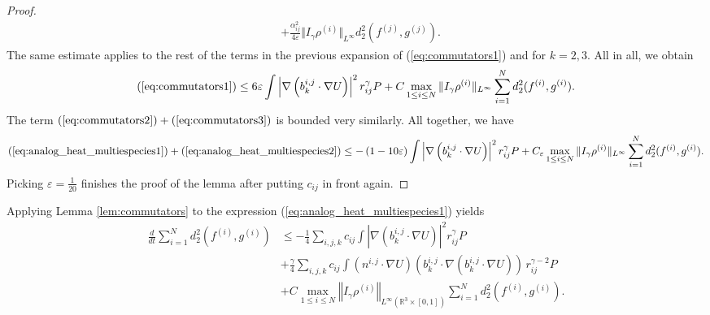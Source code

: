 \documentclass[10pt,oneside]{amsart}
\numberwithin{equation}{section}
\numberwithin{definition}{section}
\numberwithin{theorem}{section}
\numberwithin{lemma}{section}
\begin{document}
\begin{proof}
\begin{align*}
    & + \frac{\alpha_{ij}^{2}}{4\varepsilon}\Vert I_{\gamma}\rho^{(i)}\Vert _{L^{\infty}}d_{2}^{2}(f^{(j)},g^{(j)}).
  \end{align*}
  The same estimate applies to the rest of the terms in the previous expansion of (\ref{eq:commutators1}) and for $k=2,3$. All in all, we obtain
  \begin{equation*}
    (\ref{eq:commutators1}) \leq 6 \varepsilon\int\left|\nabla\left(b_{k}^{i,j}\cdot\nabla U\right)\right|^{2}r_{ij}^{\gamma}P
    +C\max_{1\leq i\leq N}\Vert I_{\gamma}\rho^{(i)}\Vert _{L^{\infty}}\sum_{i=1}^Nd_2^2(f^{(i)},g^{(i)}).
  \end{equation*}
  The term $(\ref{eq:commutators2}) + (\ref{eq:commutators3})$ is bounded very similarly. 
  All together, we have
  \begin{equation*}
    (\ref{eq:analog_heat_multiespecies1})+(\ref{eq:analog_heat_multiespecies2}) 
    \leq
    -\left(1-10\varepsilon\right)\int\left|\nabla\left(b_{k}^{i,j}\cdot\nabla U\right)\right|^{2}r_{ij}^{\gamma}P
    +C_{\varepsilon}\max_{1\leq i\leq N}\Vert I_{\gamma}\rho^{(i)}\Vert _{L^{\infty}}\sum_{i=1}^Nd_2^2(f^{(i)},g^{(i)}).
  \end{equation*}
  Picking $\varepsilon=\frac{1}{20}$ finishes the proof of the lemma after putting $c_{ij}$ in front again.
\end{proof}
%
%
Applying Lemma \ref{lem:commutators} to the expression (\ref{eq:analog_heat_multiespecies1}) yields
%
\begin{align}
  \frac{d}{dt}\sum_{i=1}^Nd_2^2(f^{(i)},g^{(i)}) & \leq -\frac{1}{4}\sum_{i,j,k}c_{ij} \int\left|\nabla\left(b_{k}^{i,j}\cdot\nabla U\right)\right|^{2}r_{ij}^{\gamma}P
   \nonumber	\\
  & +\frac{\gamma}{4}\sum_{i,j,k}c_{ij}\int\left(n^{i,j}\cdot\nabla U\right)\left(b_{k}^{i,j}\cdot\nabla\left(b_{k}^{i,j}\cdot\nabla U\right)\right)\,r_{ij}^{\gamma-2}P \label{eq:extra_term_multiespecies}\\
  & + C \max_{1\leq i\leq N}\left\Vert I_{\gamma}\rho^{(i)}\right\Vert _{L^{\infty}(\mathbb{R}^{3}\times[0,1])} \sum_{i=1}^Nd_2^2(f^{(i)},g^{(i)}).\nonumber
\end{align}
\end{document}

